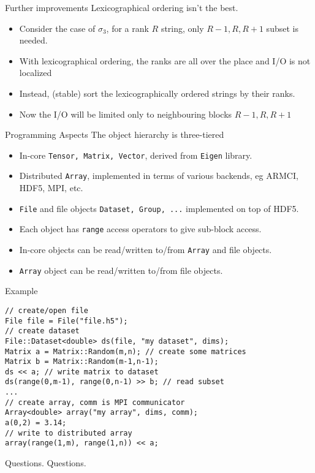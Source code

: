 \documentclass{beamer}
\begin{document}
\begin{frame}[fragile]{Further improvements}
Lexicographical ordering isn't the best.
\begin{itemize}
\item Consider the case of $\sigma_3$, for a rank $R$ string, only $R-1, R, R+1$ subset is needed.
\item With lexicographical ordering, the ranks are all over the place and I/O is not localized
\item Instead, (stable) sort the lexicographically ordered strings by their ranks.
\item Now the I/O will be limited only to neighbouring blocks $R-1, R, R+1$
\end{itemize}
\end{frame}

\begin{frame}[fragile]{Programming Aspects}
The object hierarchy is three-tiered
\begin{itemize}
\item In-core {\tt Tensor, Matrix, Vector}, derived from {\tt Eigen} library.
\item Distributed {\tt Array}, implemented in terms of various backends, eg ARMCI, HDF5, MPI, etc.
\item {\tt File} and file objects {\tt Dataset, Group, ...} implemented on top of HDF5.
\item Each object has {\tt range} access operators to give sub-block access.
\item In-core objects can be read/written to/from {\tt Array} and file objects.
\item {\tt Array} object can be read/written to/from file objects.
\end{itemize}
\end{frame}

\begin{frame}[fragile]{Example}
\begin{verbatim}
// create/open file
File file = File("file.h5");
// create dataset
File::Dataset<double> ds(file, "my dataset", dims);
Matrix a = Matrix::Random(m,n); // create some matrices
Matrix b = Matrix::Random(m-1,n-1);
ds << a; // write matrix to dataset
ds(range(0,m-1), range(0,n-1) >> b; // read subset
...
// create array, comm is MPI communicator
Array<double> array("my array", dims, comm);
a(0,2) = 3.14;
// write to distributed array
array(range(1,m), range(1,n)) << a;
\end{verbatim}
\end{frame}


\begin{frame}[fragile]{Questions.}
Questions.
\end{frame}
\end{document}
